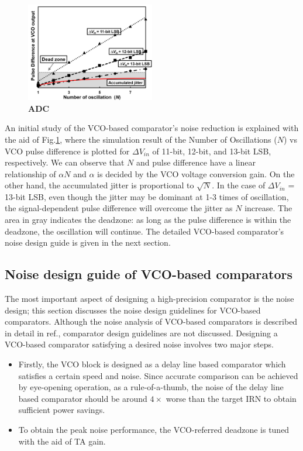 \documentclass[letterpaper, 10 pt, conference]{ieeeconf}  %
\begin{document}
\begin{figure}[ht!]
\centering
 \includegraphics[width=0.5\textwidth]{figs/fig5.png}
  \captionsetup{font=footnotesize}
  \caption{\textbf{ADC}}
  \label{fig5}
\end{figure}

An initial study of the VCO-based comparator's noise reduction is explained with the aid of Fig.\ref{fig5}, where the simulation result of the Number of Oscillations ($N$) vs VCO pulse difference is plotted for $\Delta V_{in}$ of 11-bit, 12-bit, and 13-bit LSB, respectively. We can observe that $N$ and pulse difference have a linear relationship of $\alpha N$ and $\alpha$ is decided by the VCO voltage conversion gain. On the other hand, the accumulated jitter is proportional to $\sqrt N$\cite{hajimiri1999jitter,abidi2006phase}. In the case of $\Delta V_{in}$ = 13-bit LSB, even though the jitter may be dominant at 1-3 times of oscillation, the signal-dependent pulse difference will overcome the jitter as $N$ increase. The area in gray indicates the deadzone: as long as the pulse difference is within the deadzone, the oscillation will continue. The detailed VCO-based comparator's noise design guide is given in the next section.

\subsection{Noise design guide of VCO-based comparators}
The most important aspect of designing a high-precision comparator is the noise design; this section discusses the noise design guidelines for VCO-based comparators. Although the noise analysis of VCO-based comparators is described in detail in ref.\cite{luo2020input, ding20190}, comparator design guidelines are not discussed. Designing a VCO-based comparator satisfying a desired noise involves two major steps.
\begin{itemize}
\item Firstly, the VCO block is designed as a delay line based comparator which satisfies a certain speed and noise. Since accurate comparison can be achieved by eye-opening operation, as a rule-of-a-thumb, the noise of the delay line based comparator should be around $4\times$ worse than the target IRN to obtain sufficient power savings.
\item To obtain the peak noise performance, the VCO-referred deadzone is tuned with the aid of TA gain.
\end{itemize}
\end{document}
